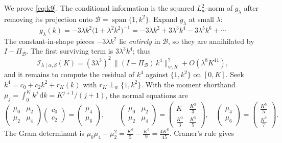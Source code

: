 \documentclass[11pt]{article}
\newcommand{\dd}{\mathrm{d}}
\newcommand{\calB}{\mathcal B}
\newcommand{\calI}{\mathcal I}
\begin{document}
We prove \eqref{eq:k9}. The conditional information is the squared \(L^2_w\)-norm of \(g_\lambda\) after removing its projection onto \(\calB=\operatorname{span}\{1,k^2\}\). Expand \(g_\lambda\) at small \(\lambda\):
\begin{equation}
g_\lambda(k)=-3\lambda k^2\big(1+\lambda^2k^2\big)^{-1}
=-3\lambda k^2+3\lambda^3k^4-3\lambda^5k^6+\cdots
\label{eq:appC-expand}
\end{equation}
The constant-in-shape pieces \(-3\lambda k^2\) lie \emph{entirely} in \(\calB\), so they are annihilated by \(I-\Pi_\calB\). The first surviving term is \(3\lambda^3k^4\); thus
\begin{equation}
\calI_{\lambda\mid\alpha,\beta}(K)=(3\lambda^3)^2\,\big\|(I-\Pi_\calB)\,k^4\big\|_{w,K}^2+O(\lambda^8K^{11}),
\label{eq:appC-reduce}
\end{equation}
and it remains to compute the residual of \(k^4\) against \(\{1,k^2\}\) on \([0,K]\). Seek \(k^4=c_0+c_2k^2+r_K(k)\) with \(r_K\perp_w\{1,k^2\}\). With the moment shorthand \(\mu_j=\int_0^K k^j\,\dd k=K^{j+1}/(j+1)\), the normal equations are
\begin{equation}
\begin{pmatrix}\mu_0&\mu_2\\ \mu_2&\mu_4\end{pmatrix}\!\begin{pmatrix}c_0\\ c_2\end{pmatrix}
=\begin{pmatrix}\mu_4\\ \mu_6\end{pmatrix},
\qquad
\begin{pmatrix}\mu_0&\mu_2\\ \mu_2&\mu_4\end{pmatrix}
=\begin{pmatrix}K&\tfrac{K^3}{3}\\[2pt]\tfrac{K^3}{3}&\tfrac{K^5}{5}\end{pmatrix},
\quad
\begin{pmatrix}\mu_4\\ \mu_6\end{pmatrix}
=\begin{pmatrix}\tfrac{K^5}{5}\\[2pt]\tfrac{K^7}{7}\end{pmatrix}.
\label{eq:appC-normal}
\end{equation}
The Gram determinant is \(\mu_0\mu_4-\mu_2^2=\tfrac{K^6}{5}-\tfrac{K^6}{9}=\tfrac{4K^6}{45}\). Cramer's rule gives
\end{document}

